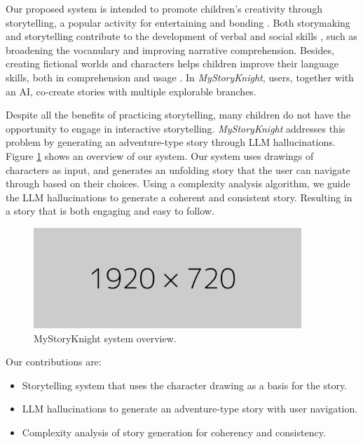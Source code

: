 \documentclass[submit,techrep,english]{ipsj}
\begin{document}
Our proposed system is intended to promote children's creativity through storytelling, a popular activity for entertaining and bonding \cite{7:SunLLL17}. Both storymaking and storytelling contribute to the development of verbal and social skills \cite{9:RyokaiC99}, such as broadening the vocanulary and improving  narrative comprehension. Besides, creating fictional worlds and characters helps children improve their language skills, both in comprehension and usage \cite{13:abs-2011-04242}. In \textit{MyStoryKnight}, users, together with an AI, co-create stories with multiple explorable branches.

Despite all the benefits of practicing storytelling, many children do not have the opportunity to engage in interactive storytelling. \textit{MyStoryKnight} addresses this problem by generating an adventure-type story through LLM hallucinations. Figure \ref{fig:system-overview}  shows an overview of our system. Our system uses drawings of characters as input, and generates an unfolding story that the user can navigate through based on their choices. Using a complexity analysis algorithm, we guide the LLM hallucinations to generate a coherent and consistent story. Resulting in a story that is both engaging and easy to follow.

\begin{figure}[t]
    \centering
    \includegraphics[width=0.9\textwidth]{figures/1920x720px.png}
    \caption{MyStoryKnight system overview.}
    \label{fig:system-overview}
\end{figure}

Our contributions are:
\begin{itemize}
    \item Storytelling system that uses the character drawing as a basis for the story.
    \item LLM hallucinations to generate an adventure-type story with user navigation.
    \item Complexity analysis of story generation for coherency and consistency.
\end{itemize}
\end{document}
